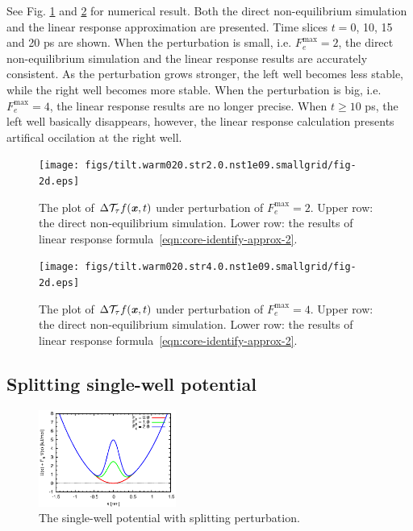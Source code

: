 \documentclass[aip,jcp,a4paper,reprint,onecolumn]{revtex4-1}
\newcommand{\vect}[1]{\textbf{\textit{#1}}}
\newcommand{\mt}{\mathcal T}
\begin{document}
See Fig. \ref{fig:tmp2} and \ref{fig:tmp3} for numerical result.  Both
the direct non-equilibrium simulation and the linear response
approximation are presented. Time slices $t = 0$, 10, 15 and 20
\textsf{ps} are shown.  When the perturbation is small,
i.e. $F_e^{\textrm{max}} = 2$, the direct non-equilibrium simulation
and the linear response results are accurately consistent. As the
perturbation grows stronger, the left well becomes less stable, while
the right well becomes more stable.  When the perturbation is big,
i.e. $F_e^{\textrm{max}} = 4$, the linear response results are no
longer precise. When $t\geq 10$ \textsf{ps}, the left well basically
disappears, however, the linear response calculation presents
artifical occilation at the right well.

\begin{figure}
  \centering
  \texttt{[image: figs/tilt.warm020.str2.0.nst1e09.smallgrid/fig-2d.eps]}
  \caption{The plot of $\Delta\mt_\tau f(\vect x,t)$  under perturbation of
    $F_e^{\textrm{max}} = 2$.
    Upper row: the direct non-equilibrium simulation. Lower row: the
    results of linear response formula~\eqref{eqn:core-identify-approx-2}.
  }
  \label{fig:tmp2}
\end{figure}

\begin{figure}
  \centering
  \texttt{[image: figs/tilt.warm020.str4.0.nst1e09.smallgrid/fig-2d.eps]}
  \caption{The plot of $\Delta\mt_\tau f(\vect x,t)$  under perturbation of
    $F_e^{\textrm{max}} = 4$.  Upper row: the direct non-equilibrium
    simulation. Lower row: the results of linear response
    formula~\eqref{eqn:core-identify-approx-2}.  }
  \label{fig:tmp3}
\end{figure}


\subsection{Splitting single-well potential}

\begin{figure}
  \centering
  \includegraphics[width=0.4\textwidth]{figs/fig-split-pot.eps}
  \caption{The single-well potential with splitting perturbation.}
  \label{fig:tmp4}
\end{figure}
\end{document}
